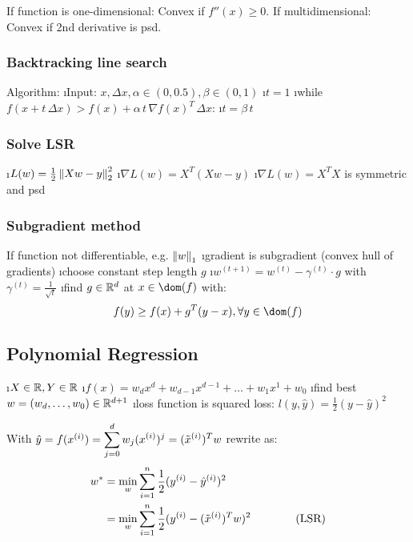 If function is one-dimensional: Convex if $f''(x) \geq 0$.
If multidimensional: Convex if 2nd derivative is psd.


\subsubsection{Backtracking line search} %

Algorithm:
\be
\i Input: $x, \Delta x, \alpha \in (0,0.5), \beta \in (0,1)$
\i $t = 1$
\i while $f(x + t \, \Delta x) > f(x) + \alpha \, t \, \nabla f(x)^T \, \Delta x$:
\i \quad $t = \beta \, t$
\ee

\subsubsection{Solve LSR}

\be
\i $L(w) = \frac{1}{2} \left\lVert Xw-y\right\rVert_2^2$
\i $\nabla L(w) = X^T(Xw-y)$
\i $\nabla L(w) = X^TX$ is symmetric and psd
\ee

\subsubsection{Subgradient method} %

If function not differentiable, e.g. $\left\lVert w\right\rVert_1$
\bi
\i gradient is subgradient (convex hull of gradients)
\i choose constant step length $g$
\i $w^{(t+1)} = w^{(t)} - \gamma^{(t)} \cdot g$ with $\gamma^{(t)} = \frac{1}{\sqrt{t}}$
\i find $g \in \mathbb{R}^d$ at $x \in \dom(f)$ with: \[f(y) \geq f(x) + g^T(y-x), \forall y \in \dom(f)\]
\ei

\subsection{Polynomial Regression}

\bi
\i $X \in \mathbb{R}, Y \in \mathbb{R}$
\i $f(x) = w_dx^d + w_{d-1}x^{d-1} + \ldots + w_1x^1 + w_0$
\i find best $w = (w_d, \ldots, w_0) \in \mathbb{R}^{d+1}$
\i loss function is squared loss: $l(y, \hat y) = \frac{1}{2}(y - \hat y)^2$
\ei

\begin{samepage}
With $\hat y = f(x^{(i)}) = \displaystyle\sum^d_{j=0}w_j (x^{(i)})^j = (\tilde x ^{(i)})^T w$ rewrite as:
\begin{align*}
  w^* &= \min_w \displaystyle\sum^n_{i=1}\frac{1}{2}(y^{(i)} - \hat y^{(i)})^2\\
  &= \min_w \displaystyle\sum^n_{i=1}\frac{1}{2}(y^{(i)} - (\tilde x ^{(i)})^T w)^2 \text{\qquad\qquad (LSR)}
\end{align*}
\end{samepage}


